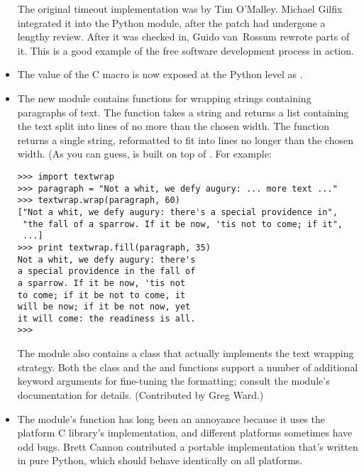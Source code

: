 \documentclass{howto}
\begin{document}
\begin{itemize}
The original timeout implementation was by Tim O'Malley.  Michael
Gilfix integrated it into the Python  module, after the
patch had undergone a lengthy review.  After it was checked in, Guido
van~Rossum rewrote parts of it.  This is a good example of the free
software development process in action.

\item The value of the C  macro is now exposed
at the Python level as .

\item The new  module contains functions for wrapping
strings containing paragraphs of text.  The  function takes a string and returns a list containing
the text split into lines of no more than the chosen width.  The
 function returns a single
string, reformatted to fit into lines no longer than the chosen width.
(As you can guess,  is built on top of
.  For example:

\begin{verbatim}
>>> import textwrap
>>> paragraph = "Not a whit, we defy augury: ... more text ..."
>>> textwrap.wrap(paragraph, 60)
["Not a whit, we defy augury: there's a special providence in",
 "the fall of a sparrow. If it be now, 'tis not to come; if it",
 ...]
>>> print textwrap.fill(paragraph, 35)
Not a whit, we defy augury: there's
a special providence in the fall of
a sparrow. If it be now, 'tis not
to come; if it be not to come, it
will be now; if it be not now, yet
it will come: the readiness is all.
>>>
\end{verbatim}

The module also contains a  class that actually
implements the text wrapping strategy.   Both the
 class and the  and
 functions support a number of additional keyword
arguments for fine-tuning the formatting; consult the module's
documentation for details.
(Contributed by Greg Ward.)

\item The  module's  function has
long been an annoyance because it uses the platform C library's
 implementation, and different platforms
sometimes have odd bugs.  Brett Cannon contributed a portable
implementation that's written in pure Python, which should behave
identically on all platforms.


\end{itemize}
\end{document}

